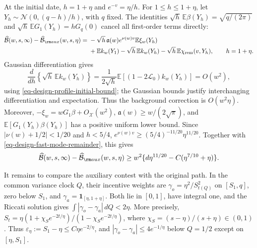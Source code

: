 \documentclass[mnsc]{informs3}
\begin{document}
\begin{APPENDICES}
{At the initial date, $h=1+\eta$ and $e^{-v}=\eta/h$.
For $1\leq h\leq1+\eta$, let $Y_h\sim\mathcal N(0,(q-h)/h)$, with $q$ fixed.
The identities $\sqrt h\,\mathbb E\beta(Y_h)=\sqrt{q/(2\pi)}$ and
$\sqrt h\,\mathbb EG_1(Y_h)=hG_q(0)$ cancel all first-order terms directly:
\[
\begin{split}
\widehat{\mathcal B}(w,s,\infty)-\widehat{\mathcal B}_{\rm aux}(w,s,\eta)
={}&-\sqrt h\,\mathfrak a(w)e^{\nu(w)v}\mathbb E\xi_w(Y_h)\\
&+\mathbb Ek_w(Y_1)-\sqrt h\,\mathbb Ek_w(Y_h)
-\sqrt h\,\mathbb E\chi_{\mathrm{rem}}(v,Y_h),\qquad h=1+\eta.
\end{split}
\]
Gaussian differentiation gives
\[
\frac d{dh}\left\{\sqrt h\,\mathbb Ek_w(Y_h)\right\}
=\frac1{2\sqrt h}\mathbb E[(1-2\mathscr L_0)k_w(Y_h)]=O(w^2),
\]
using \eqref{eq-design-profile-initial-bound}; the Gaussian bounds justify
interchanging differentiation and expectation.
Thus the background correction is $O(w^2\eta)$.
Moreover, $-\xi_w=wG_1\beta+O_{\mathscr X}(w^2)$,
$\mathfrak a(w)\geq w/(2\sqrt\pi)$, and $\mathbb E[G_1(Y_h)\beta(Y_h)]$
has a positive uniform lower bound.
Since $|\nu(w)+1/2|<1/20$ and $h<5/4$,
$e^{\nu(w)v}\geq(5/4)^{-11/20}\eta^{11/20}$.
Together with \eqref{eq-design-fast-mode-remainder}, this gives
\[
\widehat{\mathcal B}(w,s,\infty)-\widehat{\mathcal B}_{\rm aux}(w,s,\eta)
\geq w^2\{d\eta^{11/20}-C(\eta^{7/10}+\eta)\}.
\]

It remains to compare the auxiliary contest with the original path.
In the common variance clock $Q$, their incentive weights are
$\gamma_o=\eta^2/S_{t(Q)}^2$ on $[S_1,q]$, zero below $S_1$,
and $\gamma_a=\mathbf1_{[\eta,1+\eta]}$.
Both lie in $[0,1]$, have integral one, and the Riccati solution gives
$\int|\gamma_o-\gamma_a|\,dQ<2\eta$.
More precisely, $S_t=\eta(1+{\chi_S} e^{-2t/\eta})/(1-{\chi_S} e^{-2t/\eta})$,
where ${\chi_S}=(s-\eta)/(s+\eta)\in(0,1)$.
Thus $\varepsilon_\eta:=S_1-\eta\leq C\eta e^{-2/\eta}$, and
$|\gamma_o-\gamma_a|\leq4e^{-1/\eta}$ below $Q=1/2$
except on $[\eta,S_1]$.

}
\end{APPENDICES}
\end{document}
